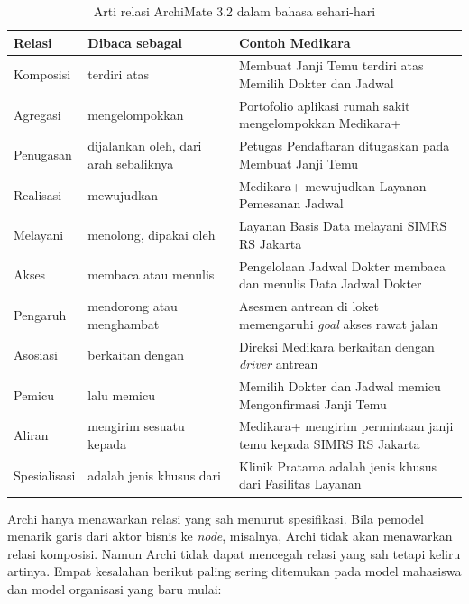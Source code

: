\begin{table}[!htb]
  \centering
  \caption{Arti relasi ArchiMate 3.2 dalam bahasa sehari-hari}
  \label{tab:ch04-relasi}
  \small
  \begin{tabularx}{\textwidth}{>{\raggedright\arraybackslash}p{2.3cm}>{\raggedright\arraybackslash}p{3.6cm}X}
    \hline
    \textbf{Relasi} & \textbf{Dibaca sebagai} & \textbf{Contoh Medikara} \\
    \hline
    Komposisi & terdiri atas & Membuat Janji Temu terdiri atas Memilih Dokter dan Jadwal \\
    \hline
    Agregasi & mengelompokkan & Portofolio aplikasi rumah sakit mengelompokkan Medikara+ \\
    \hline
    Penugasan & dijalankan oleh, dari arah sebaliknya & Petugas Pendaftaran ditugaskan pada Membuat Janji Temu \\
    \hline
    Realisasi & mewujudkan & Medikara+ mewujudkan Layanan Pemesanan Jadwal \\
    \hline
    Melayani & menolong, dipakai oleh & Layanan Basis Data melayani SIMRS RS Jakarta \\
    \hline
    Akses & membaca atau menulis & Pengelolaan Jadwal Dokter membaca dan menulis Data Jadwal Dokter \\
    \hline
    Pengaruh & mendorong atau menghambat & Asesmen antrean di loket memengaruhi \textit{goal} akses rawat jalan \\
    \hline
    Asosiasi & berkaitan dengan & Direksi Medikara berkaitan dengan \textit{driver} antrean \\
    \hline
    Pemicu & lalu memicu & Memilih Dokter dan Jadwal memicu Mengonfirmasi Janji Temu \\
    \hline
    Aliran & mengirim sesuatu kepada & Medikara+ mengirim permintaan janji temu kepada SIMRS RS Jakarta \\
    \hline
    Spesialisasi & adalah jenis khusus dari & Klinik Pratama adalah jenis khusus dari Fasilitas Layanan \\
    \hline
  \end{tabularx}
\end{table}

Archi hanya menawarkan relasi yang sah menurut spesifikasi. Bila pemodel
menarik garis dari aktor bisnis ke \textit{node}, misalnya, Archi tidak akan
menawarkan relasi komposisi. Namun Archi tidak dapat mencegah relasi yang sah
tetapi keliru artinya. Empat kesalahan berikut paling sering ditemukan pada
model mahasiswa dan model organisasi yang baru mulai:

